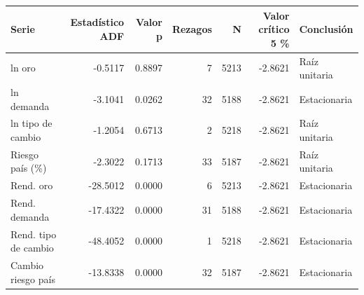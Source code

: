 \begin{tabular}{lrrrrrl}
\toprule
Serie & Estadístico ADF & Valor p & Rezagos & N & Valor crítico 5 \% & Conclusión \\
\midrule
ln oro & -0.5117 & 0.8897 & 7 & 5213 & -2.8621 & Raíz unitaria \\
ln demanda & -3.1041 & 0.0262 & 32 & 5188 & -2.8621 & Estacionaria \\
ln tipo de cambio & -1.2054 & 0.6713 & 2 & 5218 & -2.8621 & Raíz unitaria \\
Riesgo país (\%) & -2.3022 & 0.1713 & 33 & 5187 & -2.8621 & Raíz unitaria \\
Rend. oro & -28.5012 & 0.0000 & 6 & 5213 & -2.8621 & Estacionaria \\
Rend. demanda & -17.4322 & 0.0000 & 31 & 5188 & -2.8621 & Estacionaria \\
Rend. tipo de cambio & -48.4052 & 0.0000 & 1 & 5218 & -2.8621 & Estacionaria \\
Cambio riesgo país & -13.8338 & 0.0000 & 32 & 5187 & -2.8621 & Estacionaria \\
\bottomrule
\end{tabular}

